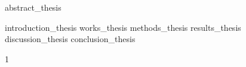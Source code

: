 \documentclass{article}
\begin{document}

  {abstract_thesis}
  \restoregeometry

\twocolumn
  {introduction_thesis}
  {works_thesis}
  {methods_thesis}
  {results_thesis}
  {discussion_thesis}
  {conclusion_thesis}

\onecolumn
  \printbibliography
  \clearpage

\begin{refsection}

\onecolumn
\appendix
  {1}
  \clearpage
\onecolumn  
  \printbibliography
\end{refsection}
    
\end{document}
